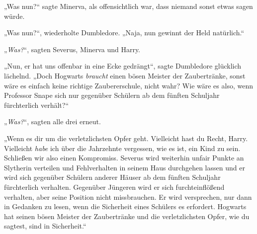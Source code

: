 „Was nun?“ sagte Minerva, als offensichtlich war, dass niemand sonst etwas sagen würde.

„Was nun?“, wiederholte Dumbledore.
„Naja, nun gewinnt der Held natürlich.“

„\emph{Was?}“, sagten Severus, Minerva und Harry.

„Nun, er hat uns offenbar in eine Ecke gedrängt“, sagte Dumbledore glücklich lächelnd.
„Doch Hogwarts \emph{braucht} einen bösen Meister der Zaubertränke, sonst wäre es einfach keine richtige Zaubererschule, nicht wahr? Wie wäre es also, wenn Professor Snape sich nur gegenüber Schülern ab dem fünften Schuljahr fürchterlich verhält?“

„\emph{Was?}“, sagten alle drei erneut.

„Wenn es dir um die verletzlichsten Opfer geht. Vielleicht hast du Recht, Harry. Vielleicht \emph{habe} ich über die Jahrzehnte vergessen, wie es ist, ein Kind zu sein. Schließen wir also einen Kompromiss. Severus wird weiterhin unfair Punkte an Slytherin verteilen und Fehlverhalten in seinem Haus durchgehen lassen und er wird sich gegenüber Schülern anderer Häuser ab dem fünften Schuljahr fürchterlich verhalten. Gegenüber Jüngeren wird er sich furchteinflößend verhalten, aber seine Position nicht missbrauchen. Er wird versprechen, nur dann in Gedanken zu lesen, wenn die Sicherheit eines Schülers es erfordert. Hogwarts hat seinen bösen Meister der Zaubertränke und die verletzlichsten Opfer, wie du sagtest, sind in Sicherheit.“

